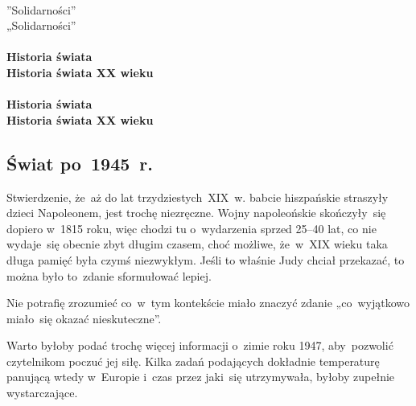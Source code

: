 \documentclass[a4paper,11pt]{article}
\begin{document}
\noi
{} \\
\Jest  ”Solidarności” \\
\Powin „Solidarności” \\
 \\
\Jest  \textbf{Historia świata} \\
\Powin \textbf{Historia świata XX wieku} \\
 \\
\Jest  \textbf{Historia świata} \\
\Powin \textbf{Historia świata XX wieku} \\

\vspace{\spaceTwo}










\subsection{Świat po~1945~r.}

\vspace{\spaceThree}





\start {} Stwierdzenie, że~aż do lat trzydziestych~XIX~w. babcie
hiszpańskie straszyły dzieci Napoleonem, jest trochę niezręczne. Wojny
napoleońskie skończyły~się dopiero w~1815 roku, więc chodzi tu
o~wydarzenia sprzed 25--40 lat, co nie wydaje~się obecnie zbyt długim
czasem, choć możliwe, że~w~XIX wieku taka długa pamięć była czymś
niezwykłym. Jeśli to właśnie Judy chciał przekazać, to można było
to~zdanie sformułować lepiej.

\vspace{\spaceFour}


\start {} Nie potrafię zrozumieć co~w~tym kontekście miało
znaczyć zdanie „co~wyjątkowo miało~się okazać nieskuteczne”.

\vspace{\spaceFour}


\start {} Warto byłoby podać trochę więcej informacji o~zimie
roku 1947, aby~pozwolić czytelnikom poczuć jej siłę. Kilka zadań
podających dokładnie temperaturę panującą wtedy w~Europie i~czas przez
jaki~się utrzymywała, byłoby zupełnie wystarczające.
\end{document}
